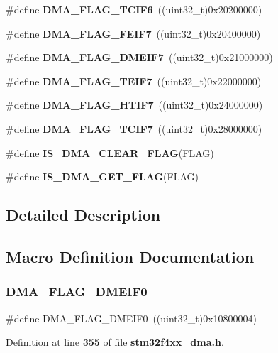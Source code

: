 \begin{DoxyCompactItemize}
\item 
\#define \textbf{ D\+M\+A\+\_\+\+F\+L\+A\+G\+\_\+\+T\+C\+I\+F6}~((uint32\+\_\+t)0x20200000)
\item 
\#define \textbf{ D\+M\+A\+\_\+\+F\+L\+A\+G\+\_\+\+F\+E\+I\+F7}~((uint32\+\_\+t)0x20400000)
\item 
\#define \textbf{ D\+M\+A\+\_\+\+F\+L\+A\+G\+\_\+\+D\+M\+E\+I\+F7}~((uint32\+\_\+t)0x21000000)
\item 
\#define \textbf{ D\+M\+A\+\_\+\+F\+L\+A\+G\+\_\+\+T\+E\+I\+F7}~((uint32\+\_\+t)0x22000000)
\item 
\#define \textbf{ D\+M\+A\+\_\+\+F\+L\+A\+G\+\_\+\+H\+T\+I\+F7}~((uint32\+\_\+t)0x24000000)
\item 
\#define \textbf{ D\+M\+A\+\_\+\+F\+L\+A\+G\+\_\+\+T\+C\+I\+F7}~((uint32\+\_\+t)0x28000000)
\item 
\#define \textbf{ I\+S\+\_\+\+D\+M\+A\+\_\+\+C\+L\+E\+A\+R\+\_\+\+F\+L\+AG}(F\+L\+AG)
\item 
\#define \textbf{ I\+S\+\_\+\+D\+M\+A\+\_\+\+G\+E\+T\+\_\+\+F\+L\+AG}(F\+L\+AG)
\end{DoxyCompactItemize}


\subsection{Detailed Description}


\subsection{Macro Definition Documentation}
\mbox{\label{group__DMA__flags__definition_gaf309e18b8d4113c51de6d23794bdaaab}} 
\subsubsection{D\+M\+A\+\_\+\+F\+L\+A\+G\+\_\+\+D\+M\+E\+I\+F0}
{\footnotesize\ttfamily \#define D\+M\+A\+\_\+\+F\+L\+A\+G\+\_\+\+D\+M\+E\+I\+F0~((uint32\+\_\+t)0x10800004)}



Definition at line \textbf{ 355} of file \textbf{ stm32f4xx\+\_\+dma.\+h}.

